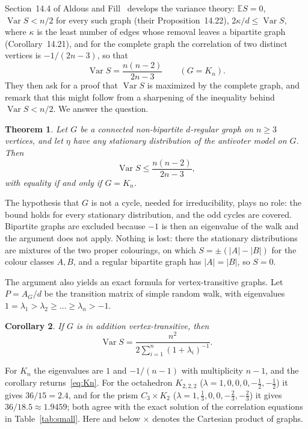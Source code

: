 \documentclass[11pt]{amsart}
\newtheorem{theorem}{Theorem}[section]
\newtheorem{corollary}[theorem]{Corollary}
\theoremstyle{remark}
\numberwithin{equation}{section}
\newcommand{\E}{\mathbb{E}}
\DeclareMathOperator{\Var}{Var}
\begin{document}
Section~14.4 of Aldous and Fill~\cite{AF} develops the variance theory: $\E S=0$, $\Var S<n/2$ for every such graph
(their Proposition~14.22), $2\kappa/d\le\Var S$, where $\kappa$ is the least number of edges whose removal leaves a bipartite graph (Corollary~14.21), and for the complete
graph the correlation of two distinct vertices is $-1/(2n-3)$, so that
\begin{equation}\label{eq:Kn}
\Var S=\frac{n(n-2)}{2n-3}\qquad (G=K_n).
\end{equation}
They then ask for a proof that $\Var S$ is maximized by the complete graph, and remark that this might follow from a
sharpening of the inequality behind $\Var S<n/2$. We answer the question.

\begin{theorem}\label{thm:main}
Let $G$ be a connected non-bipartite $d$-regular graph on $n\ge3$ vertices, and let $\eta$ have any stationary
distribution of the antivoter model on $G$. Then
\[
\Var S\le\frac{n(n-2)}{2n-3},
\]
with equality if and only if $G=K_n$.
\end{theorem}

The hypothesis that $G$ is not a cycle, needed for irreducibility, plays no role: the bound holds for every stationary
distribution, and the odd cycles are covered. Bipartite graphs are excluded because $-1$ is then an eigenvalue of the
walk and the argument does not apply. Nothing is lost: there the stationary distributions are mixtures of the two proper
colourings, on which $S=\pm(|A|-|B|)$ for the colour classes $A,B$, and a regular bipartite graph has $|A|=|B|$, so
$S=0$.

The argument also yields an exact formula for vertex-transitive graphs. Let $P=A_G/d$ be the transition matrix of
simple random walk, with eigenvalues $1=\lambda_1>\lambda_2\ge\dots\ge\lambda_n>-1$.

\begin{corollary}\label{cor:vt}
If $G$ is in addition vertex-transitive, then
\[
\Var S=\frac{n^2}{2\sum_{i=1}^n(1+\lambda_i)^{-1}}.
\]
\end{corollary}

For $K_n$ the eigenvalues are $1$ and $-1/(n-1)$ with multiplicity $n-1$, and the corollary returns~\eqref{eq:Kn}. For
the octahedron $K_{2,2,2}$ ($\lambda=1,0,0,0,-\tfrac12,-\tfrac12$) it gives $36/15=2.4$, and for the prism $C_3\times
K_2$ ($\lambda=1,\tfrac13,0,0,-\tfrac23,-\tfrac23$) it gives $36/18.5\approx1.9459$; both agree with the exact solution
of the correlation equations in Table~\ref{tab:small}. Here and below $\times$ denotes the Cartesian product of graphs.
\end{document}
